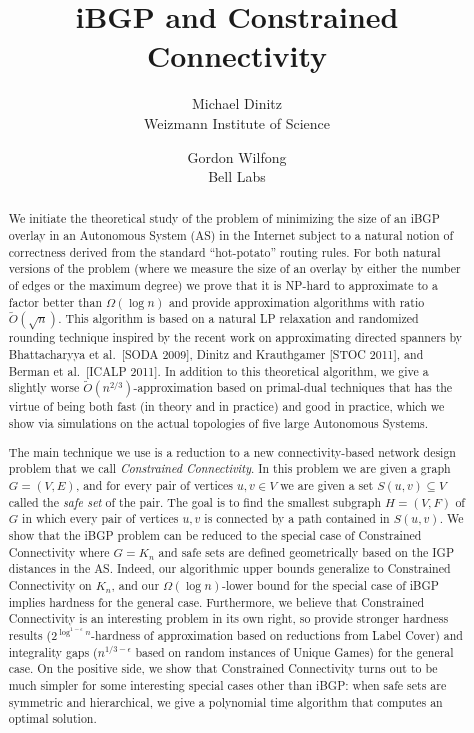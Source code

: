 \documentclass[11pt,letterpaper]{article}
\theoremstyle{definition}
\begin{document}
\title{iBGP and Constrained Connectivity}
\author{Michael Dinitz\\Weizmann Institute of Science \and Gordon Wilfong\\Bell Labs}

\begin{titlepage}
\maketitle
\thispagestyle{empty}

\begin{abstract}
We initiate the theoretical study of the problem of minimizing the size of an iBGP overlay in an Autonomous System (AS) in the Internet subject to a natural notion of correctness derived from the standard ``hot-potato'' routing rules.  For both natural versions of the problem (where we measure the size of an overlay by either the number of edges or the maximum degree) we prove that it is NP-hard to approximate to a factor better than $\Omega(\log n)$ and provide approximation algorithms with ratio $\tilde{O}(\sqrt{n})$.  This algorithm is based on a natural LP relaxation and randomized rounding technique inspired by the recent work on approximating directed spanners by Bhattacharyya et al.~[SODA 2009], Dinitz and Krauthgamer [STOC 2011], and Berman et al.~[ICALP 2011].  In addition to this theoretical algorithm, we give a slightly worse $\tilde{O}(n^{2/3})$-approximation based on primal-dual techniques that has the virtue of being both fast (in theory and in practice) and good in practice, which we show via simulations on the actual topologies of five large Autonomous Systems.

The main technique we use is a reduction to a new connectivity-based network design problem that we call \emph{Constrained Connectivity}.  In this problem we are given a graph $G=(V,E)$, and for every pair of vertices $u,v \in V$ we are given a set $S(u,v) \subseteq V$ called the \emph{safe set} of the pair.  The goal is to find the smallest subgraph $H=(V,F)$ of $G$ in which every pair of vertices $u,v$ is connected by a path contained in $S(u,v)$.  We show that the iBGP problem can be reduced to the special case of Constrained Connectivity where $G = K_n$ and safe sets are defined geometrically based on the IGP distances in the AS.  Indeed, our algorithmic upper bounds generalize to Constrained Connectivity on $K_n$, and our $\Omega(\log n)$-lower bound for the special case of iBGP implies hardness for the general case.  Furthermore, we believe that Constrained Connectivity is an interesting problem in its own right, so provide stronger hardness results ($2^{\log^{1-\epsilon} n}$-hardness of approximation based on reductions from Label Cover) and integrality gaps ($n^{1/3 - \epsilon}$ based on random instances of Unique Games) for the general case.  On the positive side, we show that Constrained Connectivity turns out to be much simpler for some interesting special cases other than iBGP: when safe sets are symmetric and hierarchical, we give a polynomial time algorithm that computes an optimal solution.
\end{abstract}

\end{titlepage}
\end{document}
